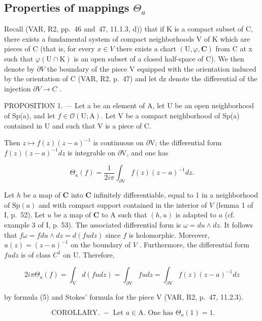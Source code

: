 \subsection{\texorpdfstring{Properties of mappings \(\Theta_{a}\)}{Properties of mappings \textbackslash Theta\_\{a\}}}

Recall (VAR, R2, pp.~46 and~47, 11.1.3, d)) that if K is a compact subset of C, there exists a fundamental system of compact neighborhoods V of K which are pieces of C (that is, for every \(x \in V\) there exists a chart \((\mathrm{U}, \varphi, \mathbf{C})\) from C at x such that \(\varphi(\mathrm{U} \cap \mathrm{K})\) is an open subset of a closed half-space of C). We then denote by \(\partial V\) the boundary of the piece V equipped with the orientation induced by the orientation of C (VAR, R2, p.~47) and let dz denote the differential of the injection \(\partial V \to C\) .

PROPOSITION 1. --- Let a be an element of A, let U be an open neighborhood of Sp(a), and let \(f \in \mathcal{O}(\mathrm{U};\mathrm{A})\). Let V be a compact neighborhood of Sp(a) contained in U and such that V is a piece of C.

Then \(z \mapsto f(z)(z - a)^{-1}\) is continuous on \(\partial\mathrm{V}\); the differential form \(f(z)(z - a)^{-1}dz\) is integrable on \(\partial\mathrm{V}\), and one has

\[
\Theta_ {a} (f) = \frac {1}{2 i \pi} \int_ {\partial \mathrm{V}} f (z) (z - a) ^ {- 1} d z.
\]

Let \(h\) be a map of \(\mathbf{C}\) into \(\mathbf{C}\) infinitely differentiable, equal to 1 in a neighborhood of \(\mathrm{Sp}(a)\) and with compact support contained in the interior of \(V\) (lemma 1 of I, p.~52). Let \(u\) be a map of \(\mathbf{C}\) to A such that \((h, u)\) is adapted to \(a\) (cf. example 3 of I, p. 53). The associated differential form is \(\omega = du \wedge dz\). It follows that \(f\omega = fdu \wedge dz = d(fu dz)\) since \(f\) is holomorphic. Moreover, \(u(z) = (z - a)^{-1}\) on the boundary of \(V\) . Furthermore, the differential form \(fu dz\) is of class \(C^1\) on U. Therefore,

\[
2 i \pi \Theta_ {a} (f) = \int_ {\mathrm{V}} d (f u d z) = \int_ {\partial \mathrm{V}} f u d z = \int_ {\partial \mathrm{V}} f (z) (z - a) ^ {- 1} d z
\]

by formula (5) and Stokes' formula for the piece V (VAR, R2, p.~47, 11.2.3).

\[
\text { COROLLARY. } - \text {   Let   } a \in \mathrm{A}. \text {   One has   } \Theta_ {a} (1) = 1.
\]


